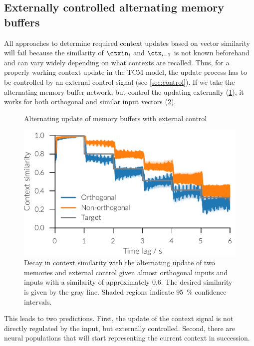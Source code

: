 \subsection{Externally controlled alternating memory buffers}
All approaches to determine required context updates based on vector similarity will fail because the similarity of $\ctxin_i$ and $\ctx_{i-1}$ is not known beforehand and can vary widely depending on what contexts are recalled.
Thus, for a properly working context update in the TCM model, the update process has to be controlled by an external control signal (see \cref{sec:control}).
If we take the alternating memory buffer network, but control the updating externally (\cref{fig:ctx-ext-ctrl}), it works for both orthogonal and similar input vectors (\cref{fig:ext-amb}).
\begin{figure}
    \centering
    \caption{Alternating update of memory buffers with external control}\label{fig:ctx-ext-ctrl}
\end{figure}
\begin{figure}
    \centering
    \includegraphics{figures/context-analysis/ext-amb}
    \caption[Decay in context similarity with the alternating update of two memories and external control]{
        Decay in context similarity with the alternating update of two memories and external control given almost orthogonal inputs and inputs with a similarity of approximately \num{0.6}.
        The desired similarity is given by the gray line. Shaded regions indicate \SI{95}{\percent} confidence intervals.}\label{fig:ext-amb}
\end{figure}

This leads to two predictions.
First, the update of the context signal is not directly regulated by the input, but externally controlled.
Second, there are neural populations that will start representing the current context in succession.
